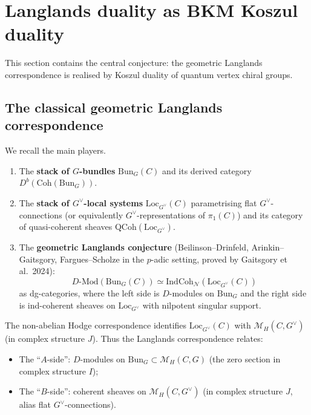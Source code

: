 \documentclass[11pt]{article}
\theoremstyle{definition}
\theoremstyle{remark}
\newcommand{\Bun}{\mathrm{Bun}}
\newcommand{\Loc}{\mathrm{Loc}}
\newcommand{\Coh}{\mathrm{Coh}}
\newcommand{\Mod}{\mathrm{Mod}}
\newcommand{\cM}{\mathcal{M}}
\newcommand{\cN}{\mathcal{N}}
\begin{document}
\section{Langlands duality as BKM Koszul duality}
\label{sec:langlands-duality}

This section contains the central conjecture: the geometric Langlands correspondence is realised by Koszul duality of quantum vertex chiral groups.

\subsection{The classical geometric Langlands correspondence}

We recall the main players.

\begin{enumerate}[label=(\roman*)]
 \item The \textbf{stack of $G$-bundles} $\Bun_G(C)$ and its derived category $D^b(\Coh(\Bun_G))$.
 \item The \textbf{stack of $G^\vee$-local systems} $\Loc_{G^\vee}(C)$ parametrising flat $G^\vee$-connections (or equivalently $G^\vee$-representations of $\pi_1(C)$) and its category of quasi-coherent sheaves $\mathrm{QCoh}(\Loc_{G^\vee})$.
 \item The \textbf{geometric Langlands conjecture} (Beilinson--Drinfeld, Arinkin--Gaitsgory, Fargues--Scholze in the $p$-adic setting, proved by Gaitsgory et al.\ 2024):
 \[
 D\text{-}\Mod(\Bun_G(C)) \simeq \mathrm{IndCoh}_{\cN}(\Loc_{G^\vee}(C))
 \]
 as dg-categories, where the left side is $D$-modules on $\Bun_G$ and the right side is ind-coherent sheaves on $\Loc_{G^\vee}$ with nilpotent singular support.
\end{enumerate}

The non-abelian Hodge correspondence identifies $\Loc_{G^\vee}(C)$ with $\cM_H(C, G^\vee)$ (in complex structure $J$). Thus the Langlands correspondence relates:
\begin{itemize}
 \item The ``$A$-side'': $D$-modules on $\Bun_G \subset \cM_H(C, G)$ (the zero section in complex structure $I$);
 \item The ``$B$-side'': coherent sheaves on $\cM_H(C, G^\vee)$ (in complex structure $J$, alias flat $G^\vee$-connections).
\end{itemize}
\end{document}
